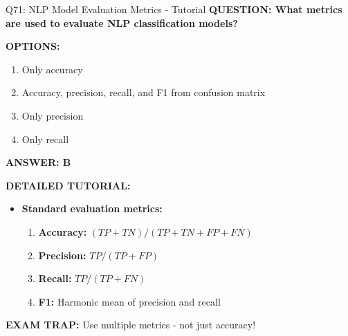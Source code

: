 \documentclass[8pt]{beamer}
\begin{document}
	\begin{frame}{Q71: NLP Model Evaluation Metrics - Tutorial}
		\fontsize{6.5}{7.5}\selectfont
		\textbf{QUESTION: What metrics are used to evaluate NLP classification models?}
		
		\vspace{0.1cm}
		\textbf{OPTIONS:}
		\begin{enumerate}
			\item Only accuracy
			\item Accuracy, precision, recall, and F1 from confusion matrix
			\item Only precision
			\item Only recall
		\end{enumerate}
		
		\vspace{0.1cm}
		\textcolor{myblue}{\textbf{ANSWER: B}}
		
		\vspace{0.1cm}
		\textbf{DETAILED TUTORIAL:}
		\begin{itemize}
			\item \textbf{Standard evaluation metrics:}
			\begin{enumerate}
				\item \textbf{Accuracy:} $(TP + TN) / (TP + TN + FP + FN)$
				\item \textbf{Precision:} $TP / (TP + FP)$
				\item \textbf{Recall:} $TP / (TP + FN)$
				\item \textbf{F1:} Harmonic mean of precision and recall
			\end{enumerate}
		\end{itemize}
		
		\textcolor{myred}{\textbf{EXAM TRAP:}} Use \textcolor{myblue}{multiple metrics} - not just accuracy!
	\end{frame}
	
\end{document}
